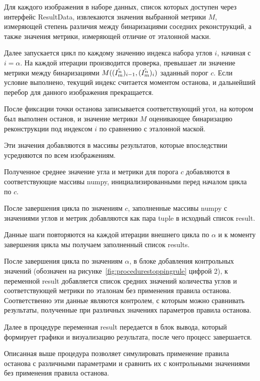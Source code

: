 Для каждого изображения в наборе данных, список которых доступен через интерфейс ResultData, извлекаются значения выбранной метрики \(M\), измеряющей степень различия между бинаризациями соседних реконструкций, а также значения метрики, измеряющей отличие от эталонной маски.

Далее запускается цикл по каждому значению индекса набора углов \(i\), начиная с \(i = \alpha\). На каждой итерации производится проверка, превышает ли значение метрики между бинаризациями \(M((\hat{I^n_m})_{i-1}, (\hat{I^n_m})_i)\) заданный порог \(c\). Если условие выполнено, текущий индекс считается моментом останова, и дальнейший перебор для данного изображения прекращается.

После фиксации точки останова записывается соответствующий угол, на котором был выполнен останов, и значение метрики \(M\) оценивающее бинаризацию реконструкции под индексом \(i\) по сравнению с эталонной маской.

Эти значения добавляются в массивы результатов, которые впоследствии усредняются по всем изображениям.

Полученное среднее значение угла и метрики для порога \(c\) добавляются в соответствующие массивы numpy, инициализированными перед началом цикла по \(c\).

После завершения цикла по значениям \(c\), заполненные массивы numpy с значениями углов и метрик добавляются как пара tuple в исходный список result.

Данные шаги повторяются на каждой итерации внешнего цикла по \(\alpha\) и к моменту завершения цикла мы получаем заполненный список results.

После завершения цикла по значениям \(\alpha\), в блоке добавления контрольных значений (обозначен на рисунке~\ref*{fig:procedurestoppingrule} цифрой 2), к переменной result добавляется список средних значений количества углов и соответствующей метрики по эталонам без применения правила останова. Соответственно эти данные являются контролем, с которым можно сравнивать результаты, полученные при различных значениях параметров правила останова.

Далее в процедуре переменная result передается в блок вывода, который формирует графики и визуализацию результата, после чего процесс завершается.

Описанная выше процедура позволяет симулировать применение правила останова с различными параметрами и сравнить их с контрольными значениями без применения правила останова.

